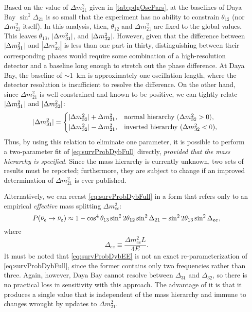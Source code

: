 \documentclass[../thesis.tex]{subfiles}
\begin{document}
Based on the value of $\Delta m^2_{21}$ given in \autoref{tab:pdgOscPars}, at the baselines of Daya Bay \(\sin^2 \Delta_{21}\) is so small that the experiment has no ability to constrain $\theta_{12}$ (nor \(\Delta m^2_{21}\) itself). In this analysis, then, $\theta_{12}$ and $\Delta m^2_{21}$ are fixed to the global values. This leaves $\theta_{13}$, \(\lvert \Delta m^2_{31}\rvert\), and \(\lvert \Delta m^2_{32}\rvert\). However, given that the difference between \(\lvert \Delta m^2_{31}\rvert\) and \(|\Delta m^2_{32}|\) is less than one part in thirty, distinguishing between their corresponding phases would require some combination of a high-resolution detector and a baseline long enough to stretch out the phase difference. At Daya Bay, the baseline of $\sim$1~km is approximately one oscillation length, where the detector resolution is insufficient to resolve the difference. On the other hand, since \(\Delta m^2_{21}\) is well constrained and known to be positive, we can tightly relate \(\lvert \Delta m^2_{31}\rvert\) and \(\lvert \Delta m^2_{32}\rvert\):
\begin{equation}
  \label{eq:hierarchy}
  \abs{\Delta m^2_{31}} =
  \begin{cases*}
    \abs{\Delta m^2_{32}} + \Delta m^2_{21}, & normal hierarchy ($\Delta m^2_{32} > 0$), \\
    \abs{\Delta m^2_{32}} - \Delta m^2_{21}, & inverted hierarchy ($\Delta m^2_{32} < 0$), \\
  \end{cases*}
\end{equation}
Thus, by using this relation to eliminate one parameter, it is possible to perform a two-parameter fit of \autoref{eq:survProbDybFull} directly, \emph{provided that the mass hierarchy is specified}. Since the mass hierarchy is currently unknown, two sets of results must be reported; furthermore, they are subject to change if an improved determination of \(\Delta m^2_{21}\) is ever published.

Alternatively, we can recast \autoref{eq:survProbDybFull} in a form that refers only to an empirical \emph{effective} mass splitting \(\Delta m^2_{ee}\):
\begin{equation}
  \label{eq:survProbDybEE}
  P(\bar\nu_e \rightarrow \bar\nu_e) \approx 1 - \cos^4\theta_{13}\sin^2 2\theta_{12} \sin^2 \Delta_{21}
  - \sin^2 2\theta_{13}\sin^2\Delta_{ee},
\end{equation}
where
\begin{equation}
  \Delta_{ee} \equiv \frac{\Delta m^2_{ee}L}{4E}. 
\end{equation}
It must be noted that \autoref{eq:survProbDybEE} is not an exact re-parameterization of \autoref{eq:survProbDybFull}, since the former contains only two frequencies rather than three. Again, however, Daya Bay cannot resolve between $\Delta_{31}$ and $\Delta_{32}$, so there is no practical loss in sensitivity with this approach. The advantage of it is that it produces a single value that is independent of the mass hierarchy and immune to changes wrought by updates to \(\Delta m^2_{21}\).
\end{document}
